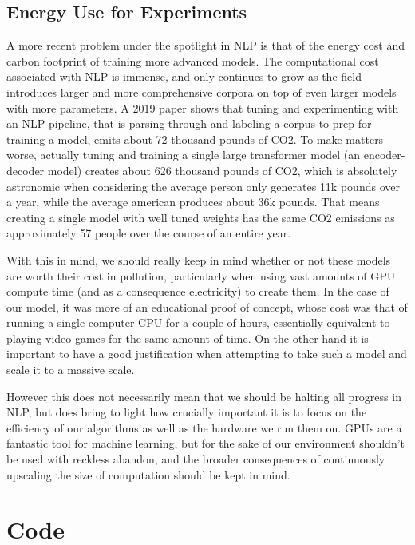 \documentclass[11pt]{article}
\begin{document}
\subsection{Energy Use for Experiments}

A more recent problem under the spotlight in NLP is that of the energy cost and carbon footprint of training more advanced models. The computational cost associated with NLP is immense, and only continues to grow as the field introduces larger and more comprehensive corpora on top of even larger models with more parameters. A 2019 paper shows that tuning and experimenting with an NLP pipeline, that is parsing through and labeling a corpus to prep for training a model, emits about 72 thousand pounds of CO2\cite{MLenergy}. To make matters worse, actually tuning and training a single large transformer model (an encoder-decoder model) creates about 626 thousand pounds of CO2, which is absolutely astronomic when considering the average person only generates 11k pounds over a year, while the average american produces about 36k pounds. That means creating a single model with well tuned weights has the same CO2 emissions as approximately 57 people over the course of an entire year.

With this in mind, we should really keep in mind whether or not these models are worth their cost in pollution, particularly when using vast amounts of GPU compute time (and as a consequence electricity) to create them. In the case of our model, it was more of an educational proof of concept, whose cost was that of running a single computer CPU for a couple of hours, essentially equivalent to playing video games for the same amount of time. On the other hand it is important to have a good justification when attempting to take such a model and scale it to a massive scale.

However this does not necessarily mean that we should be halting all progress in NLP, but does bring to light how crucially important it is to focus on the efficiency of our algorithms as well as the hardware we run them on. GPUs are a fantastic tool for machine learning, but for the sake of our environment shouldn’t be used with reckless abandon, and the broader consequences of continuously upscaling the size of computation should be kept in mind.

\section{Code}
\end{document}
